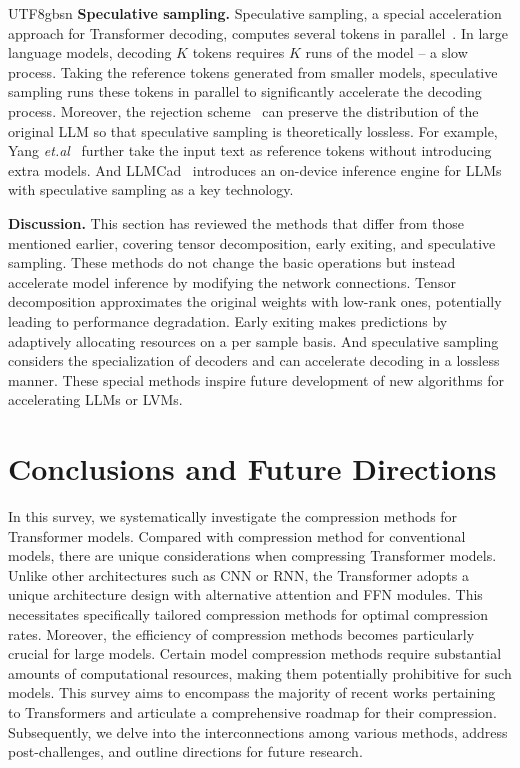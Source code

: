 \documentclass[10pt,journal,compsoc]{IEEEtran}
\newcommand{\<}{\left\langle}
\renewcommand{\>}{\right\rangle}
\newcommand{\1}{\mathbbm{1}}
\begin{document}
\begin{CJK}{UTF8}{gbsn}
\noindent\textbf{Speculative sampling.}
Speculative sampling, a special acceleration approach for Transformer decoding, computes several tokens in parallel~\cite{leviathan2023fast,chen2023accelerating}. In large language models, decoding $K$ tokens requires $K$ runs of the model -- a slow process. Taking the reference tokens generated from smaller models, speculative sampling runs these tokens in parallel to significantly accelerate the decoding process. Moreover, the rejection scheme~\cite{chen2023accelerating} can preserve the distribution of the original LLM so that speculative sampling is theoretically lossless. For example, Yang \emph{et.al}~\cite{yang2023inference} further take the input text as reference tokens without introducing extra models. And LLMCad~\cite{xu2023llmcad} introduces an on-device inference engine for LLMs with speculative sampling as a key technology.

\noindent\textbf{Discussion.}
This section has reviewed the methods that differ from those mentioned earlier, covering tensor decomposition, early exiting, and speculative sampling. These methods do not change the basic operations but instead accelerate model inference by modifying the network connections. Tensor decomposition approximates the original weights with low-rank ones, potentially leading to performance degradation. Early exiting makes predictions by adaptively allocating resources on a per sample basis. And speculative sampling considers the specialization of decoders and can accelerate decoding in a lossless manner. These special methods inspire future development of new algorithms for accelerating LLMs or LVMs.

\section{Conclusions and Future Directions}
\label{sec:con}

In this survey, we systematically investigate the  compression methods for Transformer models. Compared with compression method for conventional models, there are unique considerations when compressing  Transformer models.  Unlike other architectures such as CNN or RNN, the Transformer adopts a unique architecture design with alternative attention and FFN modules. This necessitates specifically tailored compression methods for optimal compression rates. Moreover, the efficiency of compression methods becomes particularly crucial for  large models. Certain model compression methods require substantial amounts of computational resources, making them potentially prohibitive for such models. This survey aims to encompass the majority of recent works pertaining to  Transformers and articulate a comprehensive roadmap for their compression.  Subsequently, we delve into the interconnections among various methods, address post-challenges, and outline directions for future research.



\end{CJK}
\end{document}
